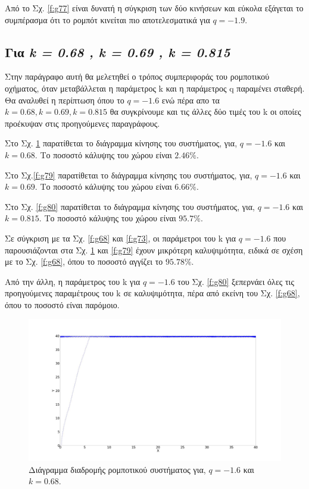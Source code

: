 Από το Σχ. \ref{f:g77} είναι δυνατή η σύγκριση των δύο κινήσεων και εύκολα εξάγεται το συμπέρασμα ότι το ρομπότ κινείται πιο αποτελεσματικά για $q = -1.9$.

\clearpage

\subsection{Για \emph{k = 0.68 , k = 0.69 , k = 0.815}}
\label{par:g2}
Στην παράγραφο αυτή θα μελετηθεί ο τρόπος συμπεριφοράς του ρομποτικού οχήματος, όταν μεταβάλλεται η παράμετρος k και η παράμετρος q παραμένει σταθερή. Θα αναλυθεί η περίπτωση όπου το $ q =-1.6$ ενώ πέρα απο τα $k = 0.68 , k = 0.69 , k = 0.815$ θα συγκρίνουμε και τις άλλες δύο τιμές του k οι οποίες προέκυψαν στις προηγούμενες παραγράφους.

Στο Σχ. \ref{f:g78} παρατίθεται το διάγραμμα κίνησης του συστήματος, για, $q = -1.6$ και $k = 0.68$.
Το ποσοστό κάλυψης του χώρου είναι  $2.46 \%$. 

Στο Σχ.\ref{f:g79} παρατίθεται το διάγραμμα κίνησης του συστήματος, για, $q = -1.6$ και $k = 0.69$.
Το ποσοστό κάλυψης του χώρου είναι  $6.66 \%$.

Στο Σχ. \ref{f:g80} παρατίθεται το διάγραμμα κίνησης του συστήματος, για, $q = -1.6$ και $k = 0.815$.
Το ποσοστό κάλυψης του χώρου είναι  $95.7\%$.

Σε σύγκριση με τα Σχ. \ref{f:g68} και \ref{f:g73}, οι παράμετροι του k για $q = -1.6$ που παρουσιάζονται στα Σχ. \ref{f:g78} και \ref{f:g79} έχουν μικρότερη καλυψιμότητα, ειδικά σε σχέση με το Σχ. \ref{f:g68}, όπου το ποσοστό αγγίζει το $95.78\%$.

Από την άλλη, η παράμετρος του k για $q = -1.6$ του Σχ. \ref{f:g80} ξεπερνάει όλες τις προηγούμενες παραμέτρους του k σε καλυψιμότητα, πέρα από εκείνη του Σχ. \ref{f:g68}, όπου το ποσοστό είναι παρόμοιο.

\begin{figure}[ht]
	\centering
	\includegraphics[width=1\linewidth]{LateX images/log/k/g1-1.6}
	\caption{Διάγραμμα διαδρομής ρομποτικού συστήματος για, $q = -1.6$ και $k = 0.68$.}
	\label{f:g78}	
\end{figure}


